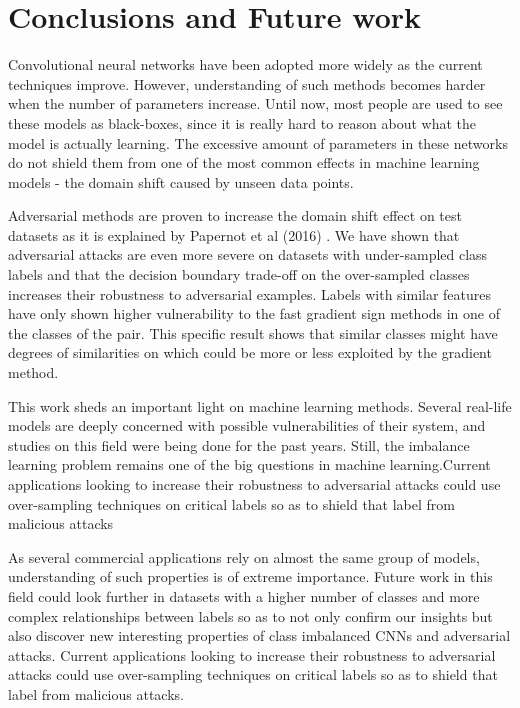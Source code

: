 \chapter{Conclusions and Future work}
Convolutional neural networks have been adopted more widely as the current techniques improve. However, understanding of such methods becomes harder when the number of parameters increase. Until now, most people  are used to see these models as black-boxes, since it is really hard to reason about what the model is actually learning. The excessive amount of parameters in these networks do not shield them from one of the most common effects in machine learning models - the domain shift caused by unseen data points.

Adversarial methods are proven to increase the domain shift effect on test datasets as it is explained by Papernot et al (2016) \cite{papernot2016transf}. We have shown that adversarial attacks are even more severe on datasets with under-sampled class labels and that the decision boundary trade-off on the over-sampled classes increases their robustness to adversarial examples. Labels with similar features have only shown higher vulnerability to the fast gradient sign methods in one of the classes of the pair. This specific result shows that similar classes might have degrees of similarities on which could be more or less exploited by the gradient method.  

This work sheds an important light on machine learning methods. Several real-life models are deeply concerned with possible vulnerabilities of their system, and studies on this field were being done for the past years. Still, the imbalance learning problem remains one of the big questions in machine learning.Current applications looking to increase their robustness to adversarial attacks could use over-sampling techniques on critical labels so as to shield that label from malicious attacks

As several commercial applications rely on almost the same group of models, understanding of such properties is of extreme importance. Future work in this field could look further in datasets with a higher number of classes and more complex relationships between labels so as to not only confirm our insights but also discover new interesting properties of class imbalanced CNNs and adversarial attacks. Current applications looking to increase their robustness to adversarial attacks could use over-sampling techniques on critical labels so as to shield that label from malicious attacks.